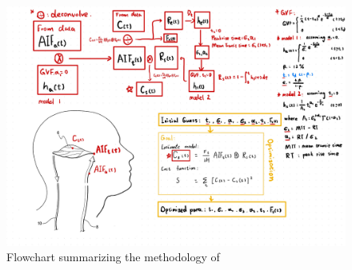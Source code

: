 \begin{frame}
\begin{columns}
    \begin{column}{0.42\textwidth}                 %
        \begin{figure}
            \centering
            \includegraphics[width=\linewidth]{figures/intro-patent.jpg}
            \caption{Flowchart summarizing the methodology of \cite{Dt_patent_wo2005104936a12005}}
            \label{fig:patent}
        \end{figure}
    \end{column}
    \end{columns}   %

\end{frame}

